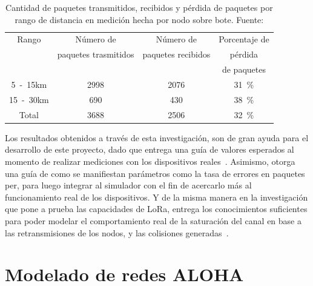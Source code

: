 \begin{justify}
\begin{table}[!ht]
\centering
\begin{tabular}{|c|c|c|c|}
\hline
Rango & Número de            & Número de          & Porcentaje de  \\
      & paquetes trasmitidos & paquetes recibidos &  pérdida\\ 
      &                      &                    &   de paquetes \\ \hline
\si{5-15}{km} & \num{2998} & \num{2076} & \SI{31}{\percent} \\ \hline
\si{15-30}{km} & \num{690} & \num{430} & \SI{38}{\percent} \\ \hline
Total & \num{3688} & \num{2506} & \SI{32}{\percent} \\ \hline
\end{tabular}
\caption{Cantidad de paquetes transmitidos, recibidos y pérdida de paquetes por rango de distancia en medición hecha por nodo sobre bote. Fuente:\cite{Juha}}
\label{arte:4}
\end{table}
\newpage \noindent
Los resultados obtenidos a través de esta investigación, son de gran ayuda para el desarrollo de este proyecto, dado que entrega una guía de valores esperados al momento de realizar mediciones con los dispositivos reales~\cite{Juha}. Asimismo, otorga una guía de como se manifiestan parámetros como la tasa de errores en paquetes \gls{per}, para luego integrar al simulador con el fin de acercarlo más al funcionamiento real de los dispositivos. Y de la misma manera en la investigación que pone a prueba las capacidades de LoRa, entrega los conocimientos suficientes para poder modelar el comportamiento real de la saturación del canal en base a las retransmisiones de los nodos, y las colisiones generadas~\cite{Xavier}.
\section{Modelado de redes ALOHA}


\end{justify}
